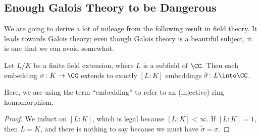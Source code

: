 \documentclass[../notes.tex]{subfiles}
\begin{document}
\subsection{Enough Galois Theory to be Dangerous}
We are going to derive a lot of mileage from the following result in field theory. It leads towards Galois theory; even though Galois theory is a beautiful subject, it is one that we can avoid somewhat.
\begin{proposition} \label{prop:embeddings-to-c}
	Let $L/K$ be a finite field extension, where $L$ is a subfield of $\CC$. Then each embedding $\sigma\colon K\to\CC$ extends to exactly $[L:K]$ embeddings $\widetilde\sigma\colon L\into\CC$.
\end{proposition}
Here, we are using the term ``embedding'' to refer to an (injective) ring homomorphism.
\begin{proof}
	We induct on $[L:K]$, which is legal because $[L:K]<\infty$. If $[L:K]=1$, then $L=K$, and there is nothing to say because we must have $\widetilde\sigma=\sigma$.


\end{proof}
\end{document}
